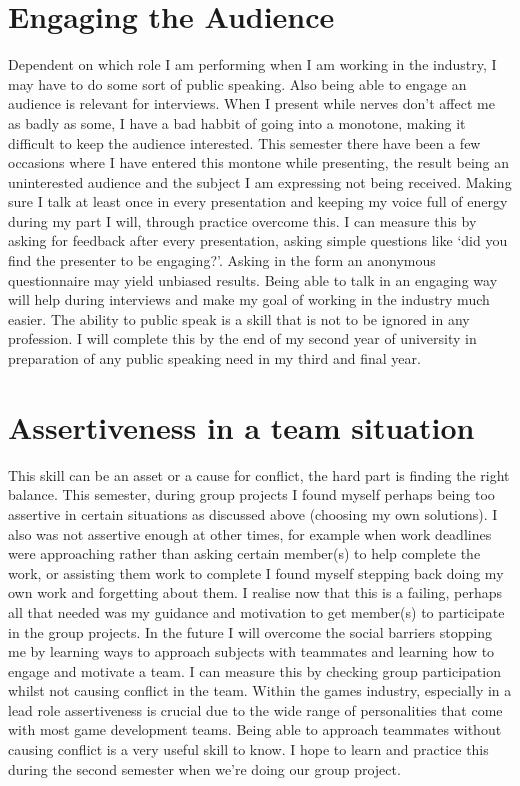 \documentclass{scrartcl}
\begin{document}
\section{Engaging the Audience}
Dependent on which role I am performing when I am working in the industry, I may have to do some sort of public speaking. Also being able to engage an audience is relevant for interviews. When I present while nerves don't affect me as badly as some, I have a bad habbit of going into a monotone, making it difficult to keep the audience interested. This semester there have been a few occasions where I have entered this montone while presenting, the result being an uninterested audience and the subject I am expressing not being received. Making sure I talk at least once in every presentation and keeping my voice full of energy during my part I will, through practice overcome this. I can measure this by asking for feedback after every presentation, asking simple questions like `did you find the presenter to be engaging?'. Asking in the form an anonymous questionnaire may yield unbiased results. Being able to talk in an engaging way will help during interviews and make my goal of working in the industry much easier. The ability to public speak is a skill that is not to be ignored in any profession. I will complete this by the end of my second year of university in preparation of any public speaking need in my third and final year.


\section{Assertiveness in a team situation}
This skill can be an asset or a cause for conflict, the hard part is finding the right balance. This semester, during group projects I found myself perhaps being too assertive in certain situations as discussed above (choosing my own solutions). I also was not assertive enough at other times, for example when work deadlines were approaching rather than asking certain member(s) to help complete the work, or assisting them work to complete I found myself stepping back doing my own work and forgetting about them. I realise now that this is a failing, perhaps all that needed was my guidance and motivation to get member(s) to participate in the group projects. In the future I will overcome the social barriers stopping me by learning ways to approach subjects with teammates and learning how to engage and motivate a team. I can measure this by checking group participation whilst not causing conflict in the team. Within the games industry, especially in a lead role assertiveness is crucial due to the wide range of personalities that come with most game development teams. Being able to approach teammates without causing conflict is a very useful skill to know. I hope to learn and practice this during the second semester when we're doing our group project. 
\end{document}

